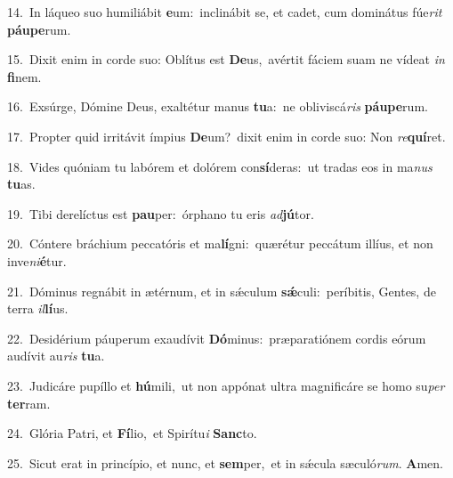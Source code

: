 {\numbfont\textcolor{\numbcolor}{14.}}~In láqueo suo humiliábit \textbf{e}\-um:~\star inclinábit se, et cadet, cum dominátus fúe\textit{rit} \textbf{páu}\-\textbf{pe}rum.\par
{\numbfont\textcolor{\numbcolor}{15.}}~Dixit enim in corde suo: Oblítus est \textbf{De}\-us,~\star avértit fáciem suam ne vídeat \textit{in} \textbf{fi}\-nem.\par
{\numbfont\textcolor{\numbcolor}{16.}}~Exsúrge, Dómine Deus, exaltétur manus \textbf{tu}\-a:~\star ne obliviscá\textit{ris} \textbf{páu}\-\textbf{pe}rum.\par
{\numbfont\textcolor{\numbcolor}{17.}}~Propter quid irritávit ímpius \textbf{De}\-um?~\star dixit enim in corde suo: Non \textit{re}\-\textbf{quí}ret.\par
{\numbfont\textcolor{\numbcolor}{18.}}~Vides quóniam tu labórem et dolórem con\-\textbf{sí}\-deras:~\star ut tradas eos in ma\textit{nus} \textbf{tu}\-as.\par
{\numbfont\textcolor{\numbcolor}{19.}}~Tibi derelíctus est \textbf{pau}\-per:~\star órphano tu eris \textit{ad}\-\textbf{jú}tor.\par
{\numbfont\textcolor{\numbcolor}{20.}}~Cóntere bráchium peccatóris et ma\-\textbf{lí}\-gni:~\star quærétur peccátum illíus, et non inve\-\textit{ni}\-\textbf{é}tur.\par
{\numbfont\textcolor{\numbcolor}{21.}}~Dóminus regnábit in ætérnum, et in sǽculum \textbf{sǽ}\-culi:~\star períbitis, Gentes, de terra \textit{il}\-\textbf{lí}us.\par
{\numbfont\textcolor{\numbcolor}{22.}}~Desidérium páuperum exaudívit \textbf{Dó}\-minus:~\star præparatiónem cordis eórum audívit au\textit{ris} \textbf{tu}\-a.\par
{\numbfont\textcolor{\numbcolor}{23.}}~Judicáre pupíllo et \textbf{hú}\-mili,~\star ut non appónat ultra magnificáre se homo su\textit{per} \textbf{ter}\-ram.\par
{\numbfont\textcolor{\numbcolor}{24.}}~Glória Patri, et \textbf{Fí}\-lio,~\star et Spirítu\textit{i} \textbf{Sanc}\-to.\par
{\numbfont\textcolor{\numbcolor}{25.}}~Sicut erat in princípio, et nunc, et \textbf{sem}\-per,~\star et in sǽcula sæculó\-\textit{rum}\-. \textbf{A}\-men.\par

